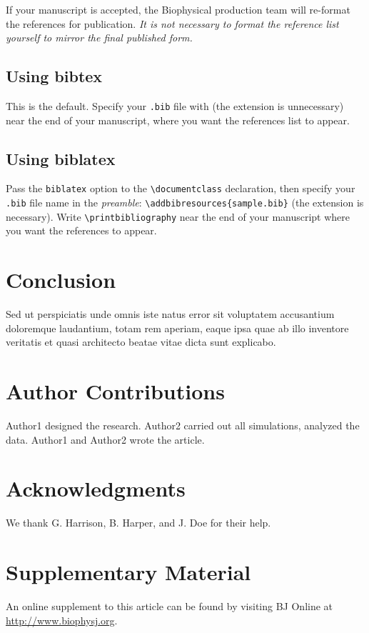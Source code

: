 \documentclass{biophys-new}
\begin{document}
If your manuscript is accepted, the Biophysical production team will re-format the references for publication. \emph{It is not necessary to format the reference list yourself to mirror the final published form.}

\subsection*{Using bibtex} 
This is the default. Specify your \texttt{.bib} file with \verb|| (the extension is unnecessary) near the end of your manuscript, where you want the references list to appear.

\subsection*{Using biblatex} 
Pass the \texttt{biblatex} option to the \verb|\documentclass| declaration, then specify your \texttt{.bib} file name in the \emph{preamble}: \verb|\addbibresources{sample.bib}| (the extension is necessary). Write \verb|\printbibliography| near the end of your manuscript where you want the references to appear.

\section*{Conclusion}

Sed ut perspiciatis unde omnis iste natus error sit voluptatem accusantium doloremque laudantium, totam rem aperiam, eaque ipsa quae ab illo inventore veritatis et quasi architecto beatae vitae dicta sunt explicabo. 

\section*{Author Contributions}

Author1 designed the research. Author2 carried out all simulations, analyzed the data. Author1 and Author2 wrote the article. 

\section*{Acknowledgments}

We thank G. Harrison, B. Harper, and J. Doe for their help.




\section*{Supplementary Material}

An online supplement to this article can be found by visiting BJ Online at \url{http://www.biophysj.org}.
\end{document}
